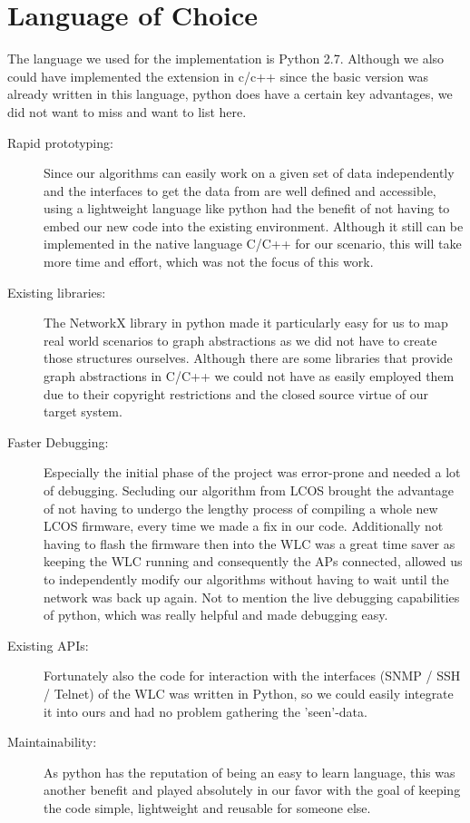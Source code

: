   \section{Language of Choice}
    The language we used for the implementation is Python 2.7. Although we also could have implemented the extension in c/c++ since the basic version
    was already written in this language, python does have a certain key advantages, we did not want to miss and want to list here.
    
    \begin{description}
      \item [Rapid prototyping:]
	Since our algorithms can easily work on a given set of data independently and the interfaces to get the data from are well defined and accessible,
	using a lightweight language like python had the benefit of not having to embed our new code into the existing environment. 
	Although it still can be implemented in the native language C/C++ for our scenario, this will take more time and effort, which was not the focus of this work.
      \item[Existing libraries:]
	The NetworkX library in python made it particularly easy for us to map real world scenarios to graph abstractions as we did not have to create those structures ourselves.
	Although there are some libraries that provide graph abstractions in C/C++ we could not have as easily employed them due to their copyright restrictions and 
	the closed source virtue of our target system.
      \item[Faster Debugging:]
	Especially the initial phase of the project was error-prone and needed a lot of debugging. Secluding our algorithm from \ac{LCOS}
	brought the advantage of not having to undergo the lengthy process of compiling a whole new LCOS firmware, every time we made a fix in our code.
	Additionally not having to flash the firmware then into the \ac{WLC} was a great time saver as keeping the \ac{WLC} running and 
	consequently the APs connected, allowed us to independently modify our algorithms without having to wait until the network was back up again. 
	Not to mention the live debugging capabilities of python, which was really helpful and made debugging easy.
      \item[Existing APIs:]
	Fortunately also the code for interaction with the interfaces (\ac{SNMP} / \ac{SSH} / Telnet) of the \ac{WLC} was written in Python, so we could easily 
	integrate it into ours and had no problem gathering the 'seen'-data.
      \item[Maintainability:]
	As python has the reputation of being an easy to learn language, this was another benefit and played absolutely in our favor with the goal of
	keeping the code simple, lightweight and reusable for someone else.
    \end{description}
    
